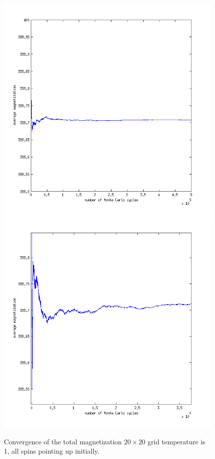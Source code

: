 \documentclass[a4paper,english, 10pt, twoside]{article}
\begin{document}
\begin{figure}[H]
\includegraphics[scale=0.5]{magnetization_ordered_temp1.png}
\includegraphics[scale=0.5]{magnetization_ordered_temp1_zoom.png}
\caption{Convergence of the total magnetization $20 \times 20$ grid temperature is 1, all spins pointing up initially.}
\label{magnet_ordered_temp1}
\end{figure}
\end{document}
